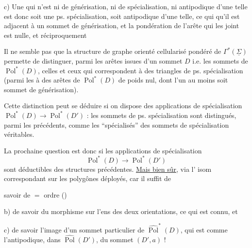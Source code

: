 c) Une   qui n'est ni  de générisation, ni de spécialisation, ni antipodique d'une telle  est donc soit une ps. spécialisation, soit antipodique d'une telle, ce qui   qu'il est adjacent à un sommet de générisation, et la pondération de l'arête qui les joint est nulle, et réciproquement



Il ne semble pas que la structure de graphe orienté cellularisé pondéré de $\Gamma^*(\underline\Sigma)$ permette de distinguer, parmi les  arêtes issues d'un sommet $D$ i.e. les sommets de $\operatorname{Pol}^*(D)$, celles et ceux qui correspondent à des triangles de ps. spécialisation (parmi les   à des arêtes  de $\operatorname{Pol}^*(D)$ de poids nul, dont  l'un au moins soit sommet de générisation).


Cette distinction peut se déduire si on dispose des applications de spécialisation  $\operatorname{Pol}^*(D)\longrightarrow\operatorname{Pol}^*(D')$ : les sommets de ps. spécialisation sont distingués, parmi les précédents, comme  les ``spécialisés'' des sommets de spécialisation véritables.

La prochaine question est donc si les applications de spécialisation
\[
\operatorname{Pol}^*(D)\longrightarrow\operatorname{Pol}^*(D')
\]
sont déductibles des structures précédentes. \uline{Mais bien sûr}, via l' isom correspondant sur les polygônes déployés, car il suffit de

 savoir  de $=$ ordre ()

b) de savoir  du morphisme sur l'ens des deux orientations, ce qui est connu, et

c) de savoir l'image d'un sommet particulier  de $\widehat{\operatorname{Pol}}^*(D)$, qui est  comme l'antipodique, dans $\widehat{\operatorname{Pol}}(D')$, du sommet $(D',a)$ !

